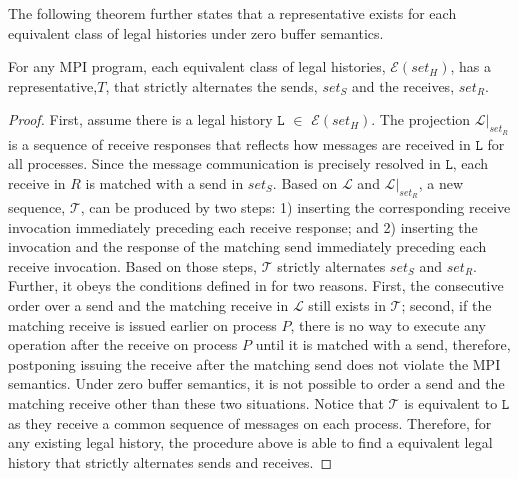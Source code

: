 The following theorem further states that a representative exists for each equivalent class of legal histories under zero buffer semantics. 

\begin{theorem}
For any MPI program, each equivalent class of legal histories, $\mathcal{E}(\mathit{set_H})$, has a representative,$T$, that strictly alternates the sends, $\mathit{set_S}$ and the receives, $\mathit{set_R}$.
\end{theorem}

\begin{proof}
First, assume there is a legal history $\mathtt{L}$ $\in$ $\mathcal{E}(\mathit{set_H})$. The projection $\mathcal{L} | _\mathit{set_R}$ is a sequence of receive responses that reflects how messages are received in $\mathtt{L}$ for all processes. Since the message communication is precisely resolved in $\mathtt{L}$, each receive in $\mathit{R}$ is matched with a send in $\mathit{set_S}$. Based on $\mathcal{L}$ and $\mathcal{L} | _\mathit{set_R}$, a new sequence, $\mathcal{T}$, can be produced by two steps: 1) inserting the corresponding receive invocation immediately preceding each receive response; and 2) inserting the invocation and the response of the matching send immediately preceding each receive invocation. Based on those steps, $\mathcal{T}$ strictly alternates $\mathit{set_S}$ and $\mathit{set_R}$. Further, it obeys the conditions defined in  for two reasons. First, the consecutive order over a send and the matching receive in $\mathcal{L}$ still exists in $\mathcal{T}$; second, if the matching receive is issued earlier on process $P$, there is no way to execute any operation after the receive on process $P$ until it is matched with a send, therefore, postponing issuing the receive after the matching send does not violate the MPI semantics. Under zero buffer semantics, it is not possible to order a send and the matching receive other than these two situations. Notice that $\mathcal{T}$ is equivalent to $\mathtt{L}$ as they receive a common sequence of messages on each process. Therefore, for any existing legal history, the procedure above is able to find a equivalent legal history that strictly alternates sends and receives. 
\end{proof}

